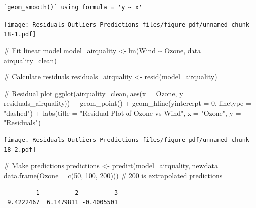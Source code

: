 \documentclass[
  letterpaper,
  DIV=11,
  numbers=noendperiod]{scrreprt}
\newenvironment{Shaded}{\begin{snugshade}}{\end{snugshade}}
\newcommand{\AttributeTok}[1]{\textcolor[rgb]{0.40,0.45,0.13}{#1}}
\newcommand{\CommentTok}[1]{\textcolor[rgb]{0.37,0.37,0.37}{#1}}
\newcommand{\DecValTok}[1]{\textcolor[rgb]{0.68,0.00,0.00}{#1}}
\newcommand{\FunctionTok}[1]{\textcolor[rgb]{0.28,0.35,0.67}{#1}}
\newcommand{\NormalTok}[1]{\textcolor[rgb]{0.00,0.23,0.31}{#1}}
\newcommand{\OtherTok}[1]{\textcolor[rgb]{0.00,0.23,0.31}{#1}}
\newcommand{\SpecialCharTok}[1]{\textcolor[rgb]{0.37,0.37,0.37}{#1}}
\newcommand{\StringTok}[1]{\textcolor[rgb]{0.13,0.47,0.30}{#1}}
\begin{document}
\begin{verbatim}
`geom_smooth()` using formula = 'y ~ x'
\end{verbatim}

\texttt{[image: Residuals\_Outliers\_Predictions\_files/figure-pdf/unnamed-chunk-18-1.pdf]}

\begin{Shaded}
\begin{Highlighting}[]
\CommentTok{\# Fit linear model}
\NormalTok{model\_airquality }\OtherTok{\textless{}{-}} \FunctionTok{lm}\NormalTok{(Wind }\SpecialCharTok{\textasciitilde{}}\NormalTok{ Ozone, }\AttributeTok{data =}\NormalTok{ airquality\_clean)}

\CommentTok{\# Calculate residuals}
\NormalTok{residuals\_airquality }\OtherTok{\textless{}{-}} \FunctionTok{resid}\NormalTok{(model\_airquality)}

\CommentTok{\# Residual plot}
\FunctionTok{ggplot}\NormalTok{(airquality\_clean, }\FunctionTok{aes}\NormalTok{(}\AttributeTok{x =}\NormalTok{ Ozone, }\AttributeTok{y =}\NormalTok{ residuals\_airquality)) }\SpecialCharTok{+}
  \FunctionTok{geom\_point}\NormalTok{() }\SpecialCharTok{+}
  \FunctionTok{geom\_hline}\NormalTok{(}\AttributeTok{yintercept =} \DecValTok{0}\NormalTok{, }\AttributeTok{linetype =} \StringTok{"dashed"}\NormalTok{) }\SpecialCharTok{+}
  \FunctionTok{labs}\NormalTok{(}\AttributeTok{title =} \StringTok{"Residual Plot of Ozone vs Wind"}\NormalTok{, }\AttributeTok{x =} \StringTok{"Ozone"}\NormalTok{, }\AttributeTok{y =} \StringTok{"Residuals"}\NormalTok{)}
\end{Highlighting}
\end{Shaded}

\texttt{[image: Residuals\_Outliers\_Predictions\_files/figure-pdf/unnamed-chunk-18-2.pdf]}

\begin{Shaded}
\begin{Highlighting}[]
\CommentTok{\# Make predictions}
\NormalTok{predictions }\OtherTok{\textless{}{-}} \FunctionTok{predict}\NormalTok{(model\_airquality, }\AttributeTok{newdata =} \FunctionTok{data.frame}\NormalTok{(}\AttributeTok{Ozone =} \FunctionTok{c}\NormalTok{(}\DecValTok{50}\NormalTok{, }\DecValTok{100}\NormalTok{, }\DecValTok{200}\NormalTok{))) }\CommentTok{\# 200 is extrapolated}
\NormalTok{predictions}
\end{Highlighting}
\end{Shaded}

\begin{verbatim}
         1          2          3 
 9.4222467  6.1479811 -0.4005501 
\end{verbatim}
\end{document}
